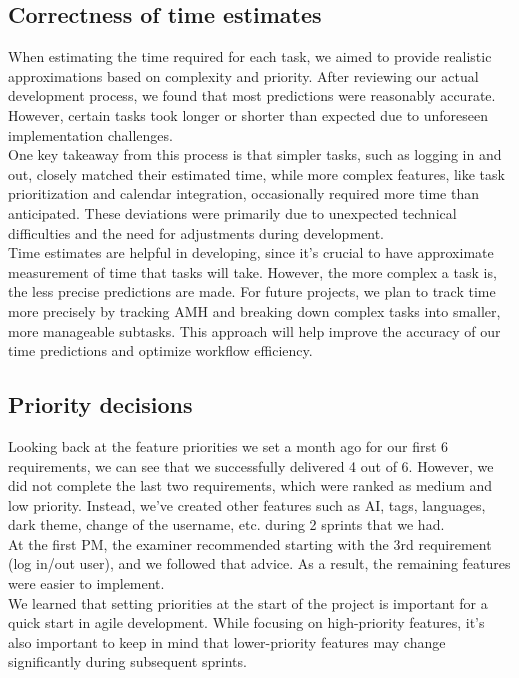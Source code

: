 \documentclass{article}
\begin{document}
\subsection{Correctness of time estimates}
When estimating the time required for each task, we aimed to provide realistic approximations based on complexity and priority. After reviewing our actual development process, we found that most predictions were reasonably accurate. However, certain tasks took longer or shorter than expected due to unforeseen implementation challenges.\\
One key takeaway from this process is that simpler tasks, such as logging in and out, closely matched their estimated time, while more complex features, like task prioritization and calendar integration, occasionally required more time than anticipated. These deviations were primarily due to unexpected technical difficulties and the need for adjustments during development.\\
Time estimates are helpful in developing, since it's crucial to have approximate measurement of time that tasks will take. However, the more complex a task is, the less precise predictions are made. For future projects, we plan to track time more precisely by tracking AMH and breaking down complex tasks into smaller, more manageable subtasks. This approach will help improve the accuracy of our time predictions and optimize workflow efficiency.

\subsection{Priority decisions}

Looking back at the feature priorities we set a month ago for our first 6 requirements, we can see that we successfully delivered 4 out of 6. However, we did not complete the last two requirements, which were ranked as medium and low priority. Instead, we've created other features such as AI, tags, languages, dark theme, change of the username, etc. during 2 sprints that we had.\\
At the first PM, the examiner recommended starting with the 3rd requirement (log in/out user), and we followed that advice. As a result, the remaining features were easier to implement.\\
We learned that setting priorities at the start of the project is important for a quick start in agile development. While focusing on high-priority features, it's also important to keep in mind that lower-priority features may change significantly during subsequent sprints.\\
\end{document}
